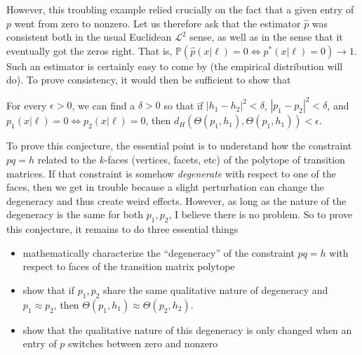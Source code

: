 However, this troubling example relied crucially on the fact that a given entry of $p$ went from zero to nonzero.  Let us therefore ask that the estimator $\hat p$ was consistent both in the usual Euclidean $\mathscr L^2$ sense, as well as in the sense that it eventually got the zeros right.  That is, $\mathbb P(\hat p(x|\ell)=0\Leftrightarrow p^*(x|\ell)=0) \rightarrow 1$.  Such an estimator is certainly easy to come by (the empirical distribution will do).  To prove consistency, it would then be sufficient to show that

\vspace{.1in}
\begin{conj}
For every $\epsilon>0$, we can find a $\delta>0$ so that if $|h_1 -h_2|^2<\delta$, $|p_1 -p_2|^2<\delta$, and $p_1(x|\ell)=0\Leftrightarrow p_2(x|\ell)=0$, then $d_H(\Theta(p_1,h_1),\Theta(p_1,h_1))<\epsilon$.
\end{conj}

To prove this conjecture, the essential point is to understand how the constraint $pq=h$ related to the $k$-faces (vertices, facets, etc) of the polytope of transition matrices.  If that constraint is somehow \emph{degenerate} with respect to one of the faces, then we get in trouble because a slight perturbation can change the degeneracy and thus create weird effects.  However, as long as the nature of the degeneracy is the same for both $p_1,p_2$, I believe there is no problem.  So to prove this conjecture, it remains to do three essential things

\begin{itemize}
    \item mathematically characterize the ``degeneracy'' of the constraint $pq=h$ with respect to faces of the transition matrix polytope
    \item show that if $p_1,p_2$ share the same qualitative nature of degeneracy and $p_1\approx p_2$, then $\Theta(p_1,h_1)\approx\Theta(p_2,h_2)$.
    \item show that the qualitative nature of this degeneracy is only changed when an entry of $p$ switches between zero and nonzero
\end{itemize}











































